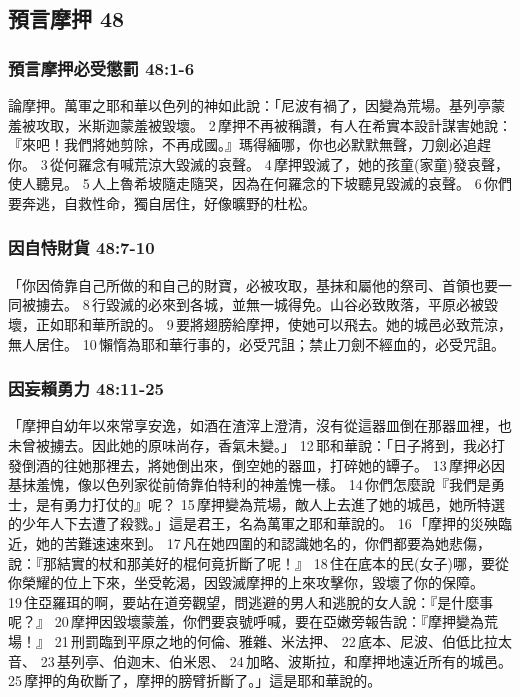 \subsection{預言摩押 48}
\subsubsection{預言摩押必受懲罰 48:1-6}
論摩押。萬軍之耶和華以色列的神如此說：「尼波有禍了，因變為荒場。基列亭蒙羞被攻取，米斯迦蒙羞被毀壞。 2 摩押不再被稱讚，有人在希實本設計謀害她說：『來吧！我們將她剪除，不再成國。』瑪得緬哪，你也必默默無聲，刀劍必追趕你。 3 從何羅念有喊荒涼大毀滅的哀聲。 4 摩押毀滅了，她的孩童(家童)發哀聲，使人聽見。 5 人上魯希坡隨走隨哭，因為在何羅念的下坡聽見毀滅的哀聲。 6 你們要奔逃，自救性命，獨自居住，好像曠野的杜松。

\subsubsection{因自恃財貨 48:7-10}
「你因倚靠自己所做的和自己的財寶，必被攻取，基抹和屬他的祭司、首領也要一同被擄去。 8 行毀滅的必來到各城，並無一城得免。山谷必致敗落，平原必被毀壞，正如耶和華所說的。 9 要將翅膀給摩押，使她可以飛去。她的城邑必致荒涼，無人居住。 10 懶惰為耶和華行事的，必受咒詛；禁止刀劍不經血的，必受咒詛。

\subsubsection{因妄賴勇力 48:11-25}

「摩押自幼年以來常享安逸，如酒在渣滓上澄清，沒有從這器皿倒在那器皿裡，也未曾被擄去。因此她的原味尚存，香氣未變。」 12 耶和華說：「日子將到，我必打發倒酒的往她那裡去，將她倒出來，倒空她的器皿，打碎她的罈子。 13 摩押必因基抹羞愧，像以色列家從前倚靠伯特利的神羞愧一樣。 14 你們怎麼說『我們是勇士，是有勇力打仗的』呢？ 15 摩押變為荒場，敵人上去進了她的城邑，她所特選的少年人下去遭了殺戮。」這是君王，名為萬軍之耶和華說的。 16 「摩押的災殃臨近，她的苦難速速來到。 17 凡在她四圍的和認識她名的，你們都要為她悲傷，說：『那結實的杖和那美好的棍何竟折斷了呢！』 18 住在底本的民(女子)哪，要從你榮耀的位上下來，坐受乾渴，因毀滅摩押的上來攻擊你，毀壞了你的保障。 19 住亞羅珥的啊，要站在道旁觀望，問逃避的男人和逃脫的女人說：『是什麼事呢？』 20 摩押因毀壞蒙羞，你們要哀號呼喊，要在亞嫩旁報告說：『摩押變為荒場！』 21 刑罰臨到平原之地的何倫、雅雜、米法押、 22 底本、尼波、伯低比拉太音、 23 基列亭、伯迦末、伯米恩、 24 加略、波斯拉，和摩押地遠近所有的城邑。 25 摩押的角砍斷了，摩押的膀臂折斷了。」這是耶和華說的。

